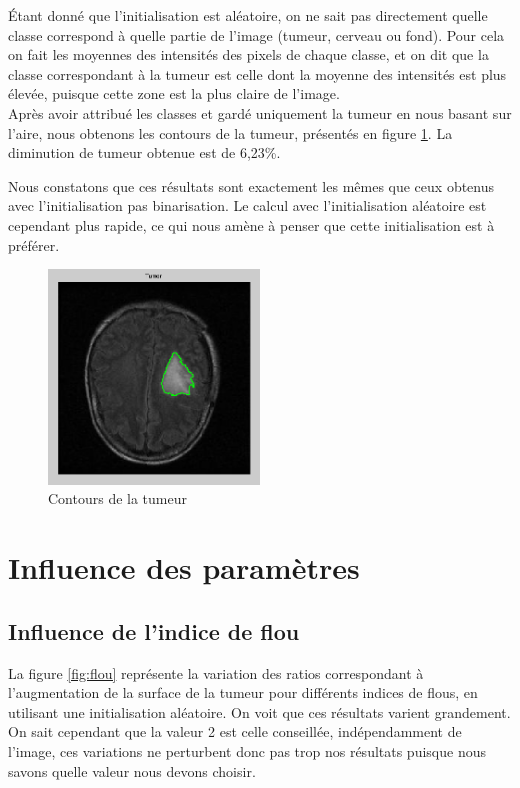 		Étant donné que l'initialisation est aléatoire, on ne sait pas directement quelle classe correspond à quelle partie de l'image (tumeur, cerveau ou fond). Pour cela on fait les moyennes des intensités des pixels de chaque classe, et on dit que la classe correspondant à la tumeur est celle dont la moyenne des intensités est plus élevée, puisque cette zone est la plus claire de l'image.\\

		Après avoir attribué les classes et gardé uniquement la tumeur en nous basant sur l'aire, nous obtenons les contours de la tumeur, présentés en figure \ref{fig:fcm_tumeur_rand}. La diminution de tumeur obtenue est de 6,23\%.

		Nous constatons que ces résultats sont exactement les mêmes que ceux obtenus avec l'initialisation pas binarisation. Le calcul avec l'initialisation aléatoire est cependant plus rapide, ce qui nous amène à penser que cette initialisation est à préférer.

		\begin{figure}[h]
			\centering
			\includegraphics[width=0.5\textwidth]{images/2-tumeur-rand.png}
			\caption{Contours de la tumeur}
			\label{fig:fcm_tumeur_rand}
		\end{figure}


\section{Influence des paramètres} %
\label{sub:influence_des_param_tres}
	\subsection{Influence de l'indice de flou} %
	\label{ssub:influence_de_l_indice_de_flou}
		La figure \ref{fig:flou} représente la variation des ratios correspondant à l'augmentation de la surface de la tumeur pour différents indices de flous, en utilisant une initialisation aléatoire. On voit que ces résultats varient grandement. On sait cependant que la valeur 2 est celle conseillée, indépendamment de l'image, ces variations ne perturbent donc pas trop nos résultats puisque nous savons quelle valeur nous devons choisir.

